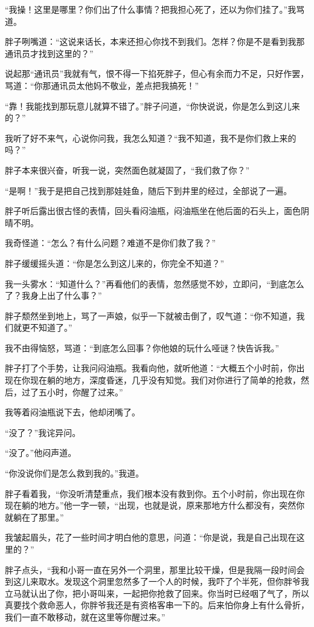 “我操！这里是哪里？你们出了什么事情？把我担心死了，还以为你们挂了。”我骂道。

胖子咧嘴道：“这说来话长，本来还担心你找不到我们。怎样？你是不是看到我那通讯员才找到这里的？”

说起那“通讯员”我就有气，恨不得一下掐死胖子，但心有余而力不足，只好作罢，骂道：“你那通讯员太他妈不敬业，差点把我搞死！”

“靠！我能找到那玩意儿就算不错了。”胖子问道，“你快说说，你是怎么到这儿来的？”

我听了好不来气，心说你问我，我怎么知道？“我不知道，我不是你们救上来的吗？”

胖子本来很兴奋，听我一说，突然面色就凝固了，“我们救了你？”

“是啊！”我于是把自己找到那娃娃鱼，随后下到井里的经过，全部说了一遍。

胖子听后露出很古怪的表情，回头看闷油瓶，闷油瓶坐在他后面的石头上，面色阴晴不明。

我奇怪道：“怎么？有什么问题？难道不是你们救了我？”

胖子缓缓摇头道：“你是怎么到这儿来的，你完全不知道？”

我一头雾水：“知道什么？”再看他们的表情，忽然感觉不妙，立即问，“到底怎么了？我身上出了什么事？”

胖子颓然坐到地上，骂了一声娘，似乎一下就被击倒了，叹气道：“你不知道，我们就更不知道了。”

我不由得恼怒，骂道：“到底怎么回事？你他娘的玩什么哑谜？快告诉我。”

胖子打了个手势，让我问闷油瓶。我看向他，就听他道：“大概五个小时前，你出现在你现在躺的地方，深度昏迷，几乎没有知觉。我们对你进行了简单的抢救，然后，过了五小时，你醒了过来。”

我等着闷油瓶说下去，他却闭嘴了。

“没了？”我诧异问。

“没了。”他闷声道。

“你没说你们是怎么救到我的。”我道。

胖子看着我，“你没听清楚重点，我们根本没有救到你。五个小时前，你出现在你现在躺的地方。”他一字一顿，“出现，也就是说，原来那地方什么都没有，突然你就躺在了那里。”

我皱起眉头，花了一些时间才明白他的意思，问道：“你是说，我是自己出现在这里的？”

胖子点头，“我和小哥一直在另外一个洞里，那里比较干燥，但是我隔一段时间会到这儿来取水。发现这个洞里忽然多了一个人的时候，我吓了个半死，但你胖爷我立马就认出了你，把小哥叫来，一起把你抢救了回来。你当时已经咽了气了，所以真要找个救命恶人，你胖爷我还是有资格客串一下的。后来怕你身上有什么骨折，我们一直不敢移动，就在这里等你醒过来。”

